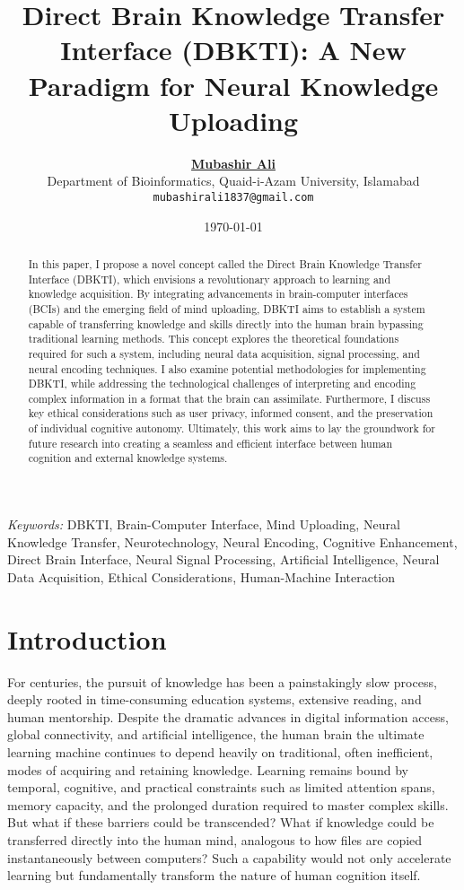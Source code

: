 \documentclass[12pt]{article}
\title{Direct Brain Knowledge Transfer Interface (DBKTI): A New Paradigm for Neural Knowledge Uploading}
\author{
\href{https://www.linkedin.com/in/mubashirali3}{\textbf{Mubashir Ali}} \\
\normalsize Department of Bioinformatics, Quaid-i-Azam University, Islamabad \\
\normalsize \texttt{mubashirali1837@gmail.com}
}
\date{\today}
\begin{document}
\onehalfspacing
\maketitle


\begin{abstract}
In this paper, I propose a novel concept called the Direct Brain Knowledge Transfer Interface (DBKTI), which envisions a revolutionary approach to learning and knowledge acquisition. By integrating advancements in brain-computer interfaces (BCIs) and the emerging field of mind uploading, DBKTI aims to establish a system capable of transferring knowledge and skills directly into the human brain bypassing traditional learning methods. This concept explores the theoretical foundations required for such a system, including neural data acquisition, signal processing, and neural encoding techniques. I also examine potential methodologies for implementing DBKTI, while addressing the technological challenges of interpreting and encoding complex information in a format that the brain can assimilate. Furthermore, I discuss key ethical considerations such as user privacy, informed consent, and the preservation of individual cognitive autonomy. Ultimately, this work aims to lay the groundwork for future research into creating a seamless and efficient interface between human cognition and external knowledge systems.

\end{abstract}

\textit{Keywords:} {DBKTI, Brain-Computer Interface, Mind Uploading, Neural Knowledge Transfer, Neurotechnology, Neural Encoding, Cognitive Enhancement, Direct Brain Interface, Neural Signal Processing, Artificial Intelligence, Neural Data Acquisition, Ethical Considerations, Human-Machine Interaction}



\section{Introduction}
For centuries, the pursuit of knowledge has been a painstakingly slow process, deeply rooted in time-consuming education systems, extensive reading, and human mentorship. Despite the dramatic advances in digital information access, global connectivity, and artificial intelligence, the human brain the ultimate learning machine continues to depend heavily on traditional, often inefficient, modes of acquiring and retaining knowledge. Learning remains bound by temporal, cognitive, and practical constraints such as limited attention spans, memory capacity, and the prolonged duration required to master complex skills. But what if these barriers could be transcended? What if knowledge could be transferred directly into the human mind, analogous to how files are copied instantaneously between computers? Such a capability would not only accelerate learning but fundamentally transform the nature of human cognition itself.
\end{document}
